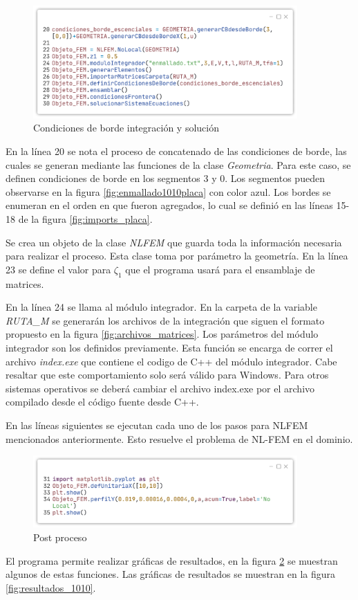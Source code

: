 \begin{enumerate}
		\begin{figure}
			\centering
			\sffamily
			\includegraphics[width=0.9\textwidth]{figuras/placa_c2.pdf}
			\caption{Condiciones de borde integración y solución}
			\label{fig:integracion_ysolucion}
		\end{figure}
		En la línea 20 se nota el proceso de concatenado de las condiciones de borde, las cuales se generan mediante las funciones de la clase \textit{Geometria}. Para este caso, se definen condiciones de borde en los segmentos 3 y 0. Los segmentos pueden observarse en la figura \ref{fig:enmallado1010placa} con color azul. Los bordes se enumeran en el orden en que fueron agregados, lo cual se definió en las líneas 15-18 de la figura \ref{fig:imports_placa}.
		
		Se crea un objeto de la clase \textit{NLFEM} que guarda toda la información necesaria para realizar el proceso. Esta clase toma por parámetro la geometría. En la línea 23 se define el valor para $\zeta_1$ que el programa usará para el ensamblaje de matrices.

		En la línea 24 se llama al módulo integrador. En la carpeta de la variable \textit{RUTA\_M} se generarán los archivos de la integración que siguen el formato propuesto en la figura \ref{fig:archivos_matrices}. Los parámetros del módulo integrador son los definidos previamente. Esta función se encarga de correr el archivo \textit{index.exe} que contiene el codigo de C++ del módulo integrador. Cabe resaltar que este comportamiento solo será válido para Windows. Para otros sistemas operativos se deberá cambiar el archivo index.exe por el archivo compilado desde el código fuente desde C++.

		En las líneas siguientes se ejecutan cada uno de los pasos para NLFEM mencionados anteriormente. Esto resuelve el problema de NL-FEM en el dominio.

		\begin{figure}
			\centering
			\sffamily
			\includegraphics[width=0.9\textwidth]{figuras/placa_c3.pdf}
			\caption{Post proceso}
			\label{fig:postproceso}
		\end{figure}
		El programa permite realizar gráficas de resultados, en la figura \ref{fig:postproceso} se muestran algunos de estas funciones. Las gráficas de resultados se muestran en la figura \ref{fig:resultados_1010}.


\end{enumerate}
